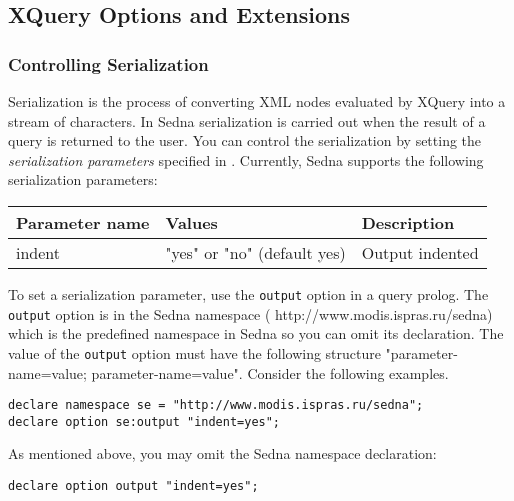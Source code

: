 \documentclass[a4paper,12pt]{article}
\begin{document}
\subsection{XQuery Options and Extensions}
\label{sec:xquery-extensions}

\subsubsection{Controlling Serialization}
\label{indents}
Serialization is the process of converting XML nodes evaluated by XQuery into a stream of characters. In Sedna serialization is carried out when the result of a query is returned to the user. You can control the serialization by setting the \emph{serialization parameters} specified in \cite{paper:query-serialization}. Currently, Sedna supports the following serialization parameters:

\begin{tabular}{|l|l|l|}
\hline
Parameter name & Values & Description \\
\hline
\hline
indent & "yes" or "no" (default yes) & Output indented \\
\hline
\end{tabular}

To set a serialization parameter, use the \verb!output! option in a query prolog. The \verb!output! option is in the Sedna namespace (
http://www.modis.ispras.ru/sedna) which is the predefined namespace in Sedna so you can omit its declaration. The value of the \verb!output! option must have the following structure "parameter-name=value; parameter-name=value". Consider the following examples.

\begin{verbatim}
declare namespace se = "http://www.modis.ispras.ru/sedna";
declare option se:output "indent=yes";
\end{verbatim}

As mentioned above, you may omit the Sedna namespace declaration:
\begin{verbatim}
declare option output "indent=yes";
\end{verbatim}
\end{document}
